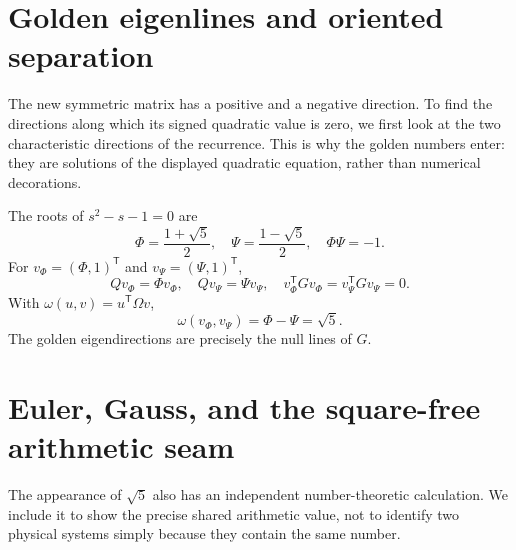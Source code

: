 \documentclass[10pt]{article}
\begin{document}
\section{Golden eigenlines and oriented separation}\label{sec:eigen}
The new symmetric matrix has a positive and a negative direction. To find the directions along which its signed quadratic value is zero, we first look at the two characteristic directions of the recurrence. This is why the golden numbers enter: they are solutions of the displayed quadratic equation, rather than numerical decorations.


The roots of $s^2-s-1=0$ are
\begin{equation}\Phi=\frac{1+\sqrt5}{2},\quad\Psi=\frac{1-\sqrt5}{2},\quad\Phi\Psi=-1.\end{equation}
For $v_\Phi=(\Phi,1)^{\mathsf T}$ and $v_\Psi=(\Psi,1)^{\mathsf T}$,
\begin{equation}Qv_\Phi=\Phi v_\Phi,\quad Qv_\Psi=\Psi v_\Psi,\quad v_\Phi^{\mathsf T}Gv_\Phi=v_\Psi^{\mathsf T}Gv_\Psi=0.\end{equation}
With $\omega(u,v)=u^{\mathsf T}\Omega v$,
\begin{equation}\boxed{\omega(v_\Phi,v_\Psi)=\Phi-\Psi=\sqrt5.}\end{equation}
The golden eigendirections are precisely the null lines of $G$.
\section{Euler, Gauss, and the square-free arithmetic seam}\label{sec:gauss}
The appearance of $\sqrt5$ also has an independent number-theoretic calculation. We include it to show the precise shared arithmetic value, not to identify two physical systems simply because they contain the same number.
\end{document}
